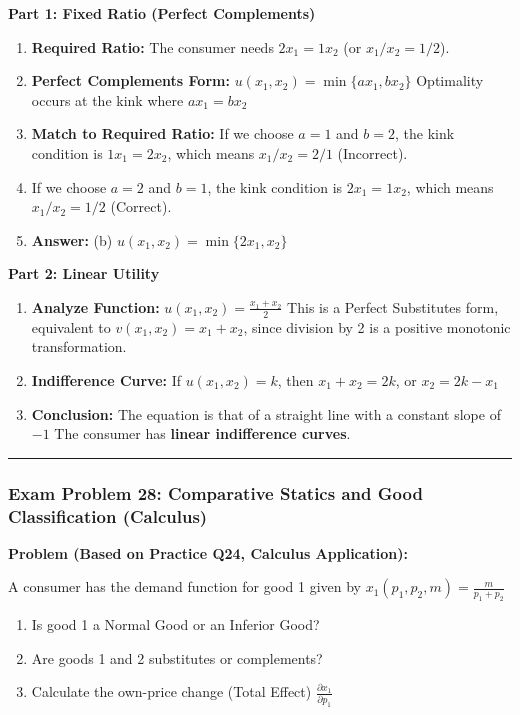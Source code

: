 \documentclass{article}
\begin{document}
\textbf{Part 1: Fixed Ratio (Perfect Complements)}
\begin{enumerate}
    \item \textbf{Required Ratio:} The consumer needs $2x_1 = 1x_2$ (or $x_1/x_2 = 1/2$).
    \item \textbf{Perfect Complements Form:} $u(x_1, x_2) = \min\{a x_1, b x_2\}$ Optimality occurs at the kink where $a x_1 = b x_2$
    \item \textbf{Match to Required Ratio:} If we choose $a=1$ and $b=2$, the kink condition is $1x_1 = 2x_2$, which means $x_1/x_2 = 2/1$ (Incorrect).
    \item If we choose $a=2$ and $b=1$, the kink condition is $2x_1 = 1x_2$, which means $x_1/x_2 = 1/2$ (Correct).
    \item \textbf{Answer:} (b) $u(x_1, x_2) = \min\{2x_1, x_2\}$
\end{enumerate}

\textbf{Part 2: Linear Utility}
\begin{enumerate}
    \item \textbf{Analyze Function:} $u(x_1, x_2) = \frac{x_1 + x_2}{2}$ This is a Perfect Substitutes form, equivalent to $v(x_1, x_2) = x_1 + x_2$, since division by 2 is a positive monotonic transformation.
    \item \textbf{Indifference Curve:} If $u(x_1, x_2) = k$, then $x_1 + x_2 = 2k$, or $x_2 = 2k - x_1$
    \item \textbf{Conclusion:} The equation is that of a straight line with a constant slope of $-1$ The consumer has \textbf{linear indifference curves}.
\end{enumerate}

\bigskip\hrule\bigskip

\subsubsection*{Exam Problem 28: Comparative Statics and Good Classification (Calculus)}

\textbf{Problem (Based on Practice Q24, Calculus Application):}

A consumer has the demand function for good 1 given by $x_1(p_1, p_2, m) = \frac{m}{p_1 + p_2}$
\begin{enumerate}
    \item Is good 1 a Normal Good or an Inferior Good?
    \item Are goods 1 and 2 substitutes or complements?
    \item Calculate the own-price change (Total Effect) $\frac{\partial x_1}{\partial p_1}$
\end{enumerate}
\end{document}
